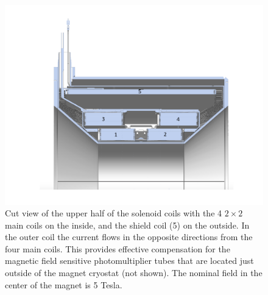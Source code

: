 \documentclass[final,3p,times,twocolumn,authoryear]{elsarticle}
\begin{document}
\begin{figure}[htbp!]
\centerline{\includegraphics[width=1.3\columnwidth]{Solenoid.pdf}}
\caption{\footnotesize Cut view of the upper half of the solenoid coils with the 4 $2 \times 2$ main coils on the inside, 
and the shield coil (5) on the outside. 
In the outer coil the current flows in the opposite directions from the four main coils. This provides effective compensation 
for the magnetic field sensitive photomultiplier tubes that are located just outside of the magnet cryostat (not shown).  
The nominal field in the center of the magnet is 5 Tesla. }
\label{solenoid-coils}
\end{figure}
\end{document}
